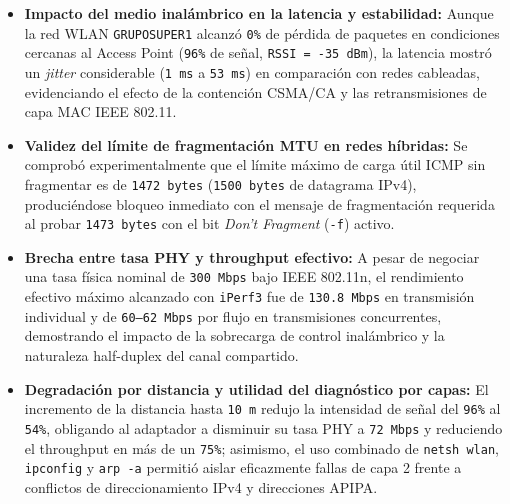 \documentclass[11pt, a4paper]{article}
\begin{document}
\begin{itemize}
    \item \textbf{Impacto del medio inalámbrico en la latencia y estabilidad:} Aunque la red WLAN \texttt{GRUPOSUPER1} alcanzó \texttt{0\%} de pérdida de paquetes en condiciones cercanas al Access Point (\texttt{96\%} de señal, \texttt{RSSI = -35 dBm}), la latencia mostró un \textit{jitter} considerable (\texttt{1 ms} a \texttt{53 ms}) en comparación con redes cableadas, evidenciando el efecto de la contención CSMA/CA y las retransmisiones de capa MAC IEEE 802.11.
    \item \textbf{Validez del límite de fragmentación MTU en redes híbridas:} Se comprobó experimentalmente que el límite máximo de carga útil ICMP sin fragmentar es de \texttt{1472 bytes} (\texttt{1500 bytes} de datagrama IPv4), produciéndose bloqueo inmediato con el mensaje de fragmentación requerida al probar \texttt{1473 bytes} con el bit \textit{Don't Fragment} (\texttt{-f}) activo.
    \item \textbf{Brecha entre tasa PHY y throughput efectivo:} A pesar de negociar una tasa física nominal de \texttt{300 Mbps} bajo IEEE 802.11n, el rendimiento efectivo máximo alcanzado con \texttt{iPerf3} fue de \texttt{130.8 Mbps} en transmisión individual y de \texttt{60--62 Mbps} por flujo en transmisiones concurrentes, demostrando el impacto de la sobrecarga de control inalámbrico y la naturaleza half-duplex del canal compartido.
    \item \textbf{Degradación por distancia y utilidad del diagnóstico por capas:} El incremento de la distancia hasta \texttt{10 m} redujo la intensidad de señal del \texttt{96\%} al \texttt{54\%}, obligando al adaptador a disminuir su tasa PHY a \texttt{72 Mbps} y reduciendo el throughput en más de un \texttt{75\%}; asimismo, el uso combinado de \texttt{netsh wlan}, \texttt{ipconfig} y \texttt{arp -a} permitió aislar eficazmente fallas de capa 2 frente a conflictos de direccionamiento IPv4 y direcciones APIPA.
\end{itemize}
\end{document}
